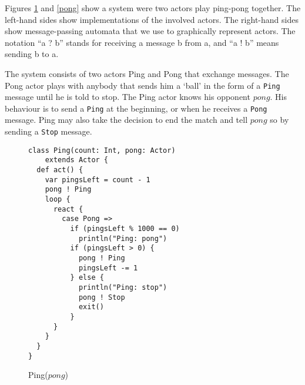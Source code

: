 \documentclass[a4paper]{report}
\numberwithin{algorithm}{chapter}
\begin{document}
\begin{example}

Figures \ref{ping} and \ref{pong} show a system were two actors play ping-pong together.
The left-hand sides show \scala{} implementations of the involved actors.
The right-hand sides show message-passing automata that we use to graphically represent actors.
The notation ``a ? b'' stands for receiving a message b from a, and ``a ! b'' means sending b to a.

The system consists of two actors Ping and Pong that exchange messages.
The Pong actor plays with anybody that sends him a `ball' in the form of a \texttt{Ping} message until he is told to stop.
The Ping actor knows his opponent $pong$.
His behaviour is to send a \texttt{Ping} at the beginning, or when he receives a \texttt{Pong} message.
Ping may also take the decision to end the match and tell $pong$ so by sending a \texttt{Stop} message.

\begin{figure}[ht]
  \centering
\begin{subfloat}
\begin{minipage}[b]{6cm}
{\scriptsize
\begin{verbatim}
class Ping(count: Int, pong: Actor)
    extends Actor {
  def act() {
    var pingsLeft = count - 1
    pong ! Ping
    loop {
      react {
        case Pong =>
          if (pingsLeft % 1000 == 0)
            println("Ping: pong")
          if (pingsLeft > 0) {
            pong ! Ping
            pingsLeft -= 1
          } else {
            println("Ping: stop")
            pong ! Stop
            exit()
          }
      }
    }
  }
}
\end{verbatim}
}
\end{minipage}
\end{subfloat}
  \caption{Ping($pong$)}
  \label{ping}
\end{figure}



\end{example}
\end{document}
